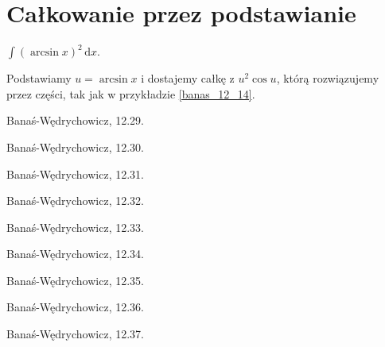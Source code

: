 \section{Całkowanie przez podstawianie}

\begin{integral}
    $\int (\arcsin x)^2 \,\mathrm{d}x$.
\end{integral}

\begin{solution}
    Podstawiamy $u = \arcsin x$ i dostajemy całkę z $u^2 \cos u$, którą rozwiązujemy przez części, tak jak w przykładzie \ref{banas_12_14}.
\end{solution}

\begin{integral}
    Banaś-Wędrychowicz, 12.29.
\end{integral}

\begin{integral}
    Banaś-Wędrychowicz, 12.30.
\end{integral}

\begin{integral}
    Banaś-Wędrychowicz, 12.31.
\end{integral}

\begin{integral}
    Banaś-Wędrychowicz, 12.32.
\end{integral}

\begin{integral}
    Banaś-Wędrychowicz, 12.33.
\end{integral}

\begin{integral}
    Banaś-Wędrychowicz, 12.34.
\end{integral}

\begin{integral}
    Banaś-Wędrychowicz, 12.35.
\end{integral}

\begin{integral}
    Banaś-Wędrychowicz, 12.36.
\end{integral}

\begin{integral}
    Banaś-Wędrychowicz, 12.37.
\end{integral}

